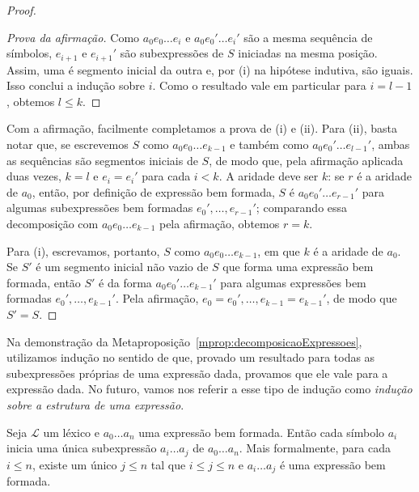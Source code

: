 \begin{proof}
\begin{proof}[Prova da afirmação]
        Como $a_0e_0\dots e_i$ e $a_0e_0'\dots e_i'$ são a mesma sequência de símbolos,
        $e_{i+1}$ e $e_{i+1}'$ são subexpressões de $S$ iniciadas na mesma posição.
        Assim, uma é segmento inicial da outra e, por (i) na hipótese indutiva, são iguais.
        Isso conclui a indução sobre $i$.
        Como o resultado vale em particular para $i=l-1$, obtemos $l\leq k$.
    \end{proof}

    Com a afirmação, facilmente completamos a prova de (i) e (ii).
    Para (ii), basta notar que, se escrevemos $S$ como $a_0e_0\dots e_{k-1}$ e também como $a_0e_0'\dots e_{l-1}'$, ambas as sequências são segmentos iniciais de $S$, de modo que, pela afirmação aplicada duas vezes, $k=l$ e $e_i=e_i'$ para cada $i<k$.
    A aridade deve ser $k$: se $r$ é a aridade de $a_0$, então, por definição de expressão bem formada, $S$ é $a_0e_0'\dots e_{r-1}'$ para algumas subexpressões bem formadas $e_0',\dots,e_{r-1}'$; comparando essa decomposição com $a_0e_0\dots e_{k-1}$ pela afirmação, obtemos $r=k$.

    Para (i), escrevamos, portanto, $S$ como $a_0e_0\dots e_{k-1}$, em que $k$ é a aridade de $a_0$.
    Se $S'$ é um segmento inicial não vazio de $S$ que forma uma expressão bem formada, então $S'$ é da forma $a_0e_0'\dots e_{k-1}'$ para algumas expressões bem formadas $e_0',\dots,e_{k-1}'$.
    Pela afirmação, $e_0=e_0', \dots, e_{k-1}=e_{k-1}'$, de modo que $S'=S$.
\end{proof}

Na demonstração da Metaproposição~\ref{mprop:decomposicaoExpressoes}, utilizamos indução no sentido de que, provado um resultado para todas as subexpressões próprias de uma expressão dada, provamos que ele vale para a expressão dada.
No futuro, vamos nos referir a esse tipo de indução como \emph{indução sobre a estrutura de uma expressão}.
\begin{metaproposition}\label{mprop:unicidadeDeLeitura}
    Seja $\mathcal L$ um léxico e $a_0\dots a_n$ uma expressão bem formada.
    Então cada símbolo $a_i$ inicia uma única subexpressão $a_i\dots a_j$ de $a_0\dots a_n$.
    Mais formalmente, para cada $i\leq n$, existe um único $j\leq n$ tal que $i\leq j\leq n$ e $a_i\dots a_j$ é uma expressão bem formada.
\end{metaproposition}

